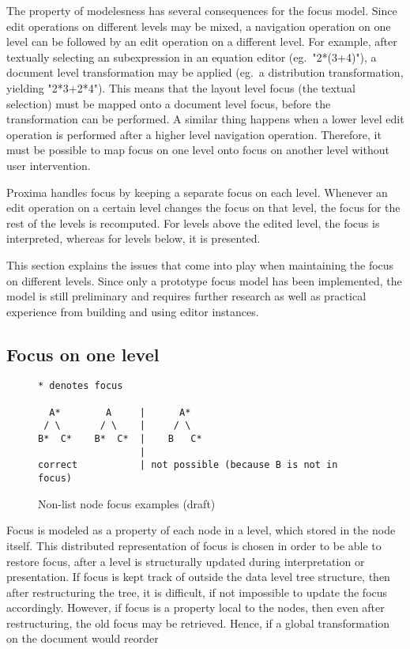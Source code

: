 The property of modelesness has several consequences for the focus model. Since edit operations on different levels may be mixed, a navigation operation on one level can be followed by an edit operation on a different level. For example, after textually selecting an subexpression in an equation editor (eg.\ "2*(3+4)"), a document level transformation may be applied (eg.\ a distribution transformation, yielding "2*3+2*4"). This means that the layout level focus (the textual selection) must be mapped onto a document level focus, before the transformation can be performed. A similar thing happens when a lower level edit operation is performed after a higher level navigation operation. Therefore, it must be possible to map focus on one level onto focus on another level without user intervention.

Proxima handles focus by keeping a separate focus on each level. Whenever an edit operation on a certain level changes the focus on that level, the focus for the rest of the levels is recomputed. For levels above the edited level, the focus is interpreted, whereas for levels below, it is presented.

This section explains the issues that come into play when maintaining the focus on different levels. Since only a prototype focus model has been implemented, the model is still preliminary and requires further research as well as practical experience from building and using editor instances. 

 
%																
\subsection{Focus on one level}

\begin{figure}
\begin{small}
\begin{center}
\begin{verbatim}
* denotes focus

  A*        A     |      A*
 / \       / \    |     / \
B*  C*    B*  C*  |    B   C*
                  |
correct           | not possible (because B is not in focus)
\end{verbatim}
\caption{Non-list node focus examples (draft)}\label{correctIncorrect focus} 
\end{center}
\end{small}
\end{figure}

Focus is modeled as a property of each node in a level, which stored in the node itself. This distributed representation of focus is chosen in order to be able to restore focus, after a level is structurally updated during interpretation or presentation. If focus is kept track of outside the data level tree structure, then after restructuring the tree, it is difficult, if not impossible to update the focus accordingly. However, if focus is a property local to the nodes, then even after restructuring, the old focus may be retrieved. Hence, if a global transformation on the document would reorder 

